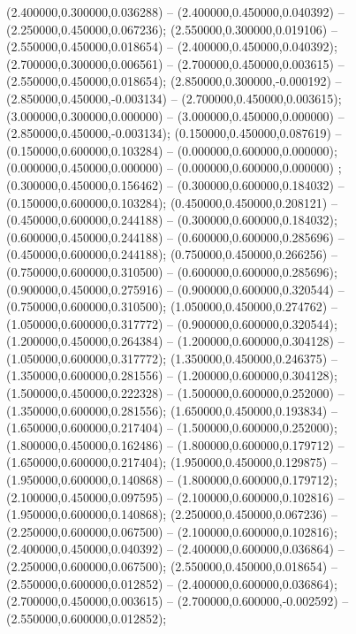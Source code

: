 (2.400000,0.300000,0.036288) -- (2.400000,0.450000,0.040392) -- (2.250000,0.450000,0.067236);
 (2.550000,0.300000,0.019106) -- (2.550000,0.450000,0.018654) -- (2.400000,0.450000,0.040392);
 (2.700000,0.300000,0.006561) -- (2.700000,0.450000,0.003615) -- (2.550000,0.450000,0.018654);
 (2.850000,0.300000,-0.000192) -- (2.850000,0.450000,-0.003134) -- (2.700000,0.450000,0.003615);
 (3.000000,0.300000,0.000000) -- (3.000000,0.450000,0.000000) -- (2.850000,0.450000,-0.003134);
 (0.150000,0.450000,0.087619) -- (0.150000,0.600000,0.103284) -- (0.000000,0.600000,0.000000);
 (0.000000,0.450000,0.000000) -- (0.000000,0.600000,0.000000) ;
 (0.300000,0.450000,0.156462) -- (0.300000,0.600000,0.184032) -- (0.150000,0.600000,0.103284);
 (0.450000,0.450000,0.208121) -- (0.450000,0.600000,0.244188) -- (0.300000,0.600000,0.184032);
 (0.600000,0.450000,0.244188) -- (0.600000,0.600000,0.285696) -- (0.450000,0.600000,0.244188);
 (0.750000,0.450000,0.266256) -- (0.750000,0.600000,0.310500) -- (0.600000,0.600000,0.285696);
 (0.900000,0.450000,0.275916) -- (0.900000,0.600000,0.320544) -- (0.750000,0.600000,0.310500);
 (1.050000,0.450000,0.274762) -- (1.050000,0.600000,0.317772) -- (0.900000,0.600000,0.320544);
 (1.200000,0.450000,0.264384) -- (1.200000,0.600000,0.304128) -- (1.050000,0.600000,0.317772);
 (1.350000,0.450000,0.246375) -- (1.350000,0.600000,0.281556) -- (1.200000,0.600000,0.304128);
 (1.500000,0.450000,0.222328) -- (1.500000,0.600000,0.252000) -- (1.350000,0.600000,0.281556);
 (1.650000,0.450000,0.193834) -- (1.650000,0.600000,0.217404) -- (1.500000,0.600000,0.252000);
 (1.800000,0.450000,0.162486) -- (1.800000,0.600000,0.179712) -- (1.650000,0.600000,0.217404);
 (1.950000,0.450000,0.129875) -- (1.950000,0.600000,0.140868) -- (1.800000,0.600000,0.179712);
 (2.100000,0.450000,0.097595) -- (2.100000,0.600000,0.102816) -- (1.950000,0.600000,0.140868);
 (2.250000,0.450000,0.067236) -- (2.250000,0.600000,0.067500) -- (2.100000,0.600000,0.102816);
 (2.400000,0.450000,0.040392) -- (2.400000,0.600000,0.036864) -- (2.250000,0.600000,0.067500);
 (2.550000,0.450000,0.018654) -- (2.550000,0.600000,0.012852) -- (2.400000,0.600000,0.036864);
 (2.700000,0.450000,0.003615) -- (2.700000,0.600000,-0.002592) -- (2.550000,0.600000,0.012852);
